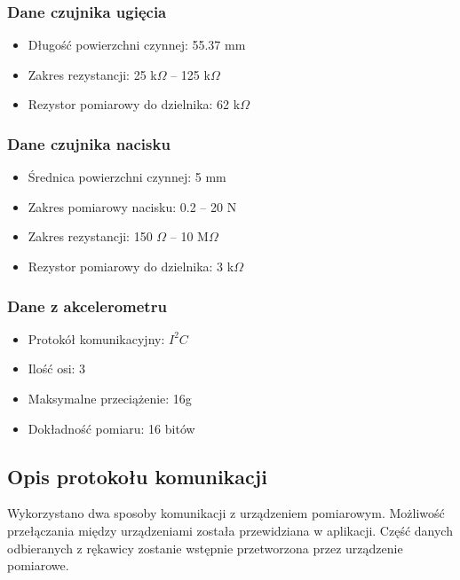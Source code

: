 \documentclass[12pt,a4paper]{article}
\begin{document}
\newpage
\subsubsection{Dane czujnika ugięcia}
\begin{itemize}
\item Długość powierzchni czynnej: 55.37 mm
\item Zakres rezystancji: 25 k$\Omega$ -- 125 k$\Omega$
\item Rezystor pomiarowy do dzielnika: 62 k$\Omega$
\end{itemize}
\subsubsection{Dane czujnika nacisku}
\begin{itemize}
\item Średnica powierzchni czynnej: 5 mm
\item Zakres pomiarowy nacisku: 0.2 -- 20 N
\item Zakres rezystancji: 150 $\Omega$ -- 10 M$\Omega$
\item Rezystor pomiarowy do dzielnika: 3 k$\Omega$
\end{itemize}
\subsubsection{Dane z akcelerometru}
\begin{itemize}
\item Protokół komunikacyjny: $I^2C$
\item Ilość osi: 3
\item Maksymalne przeciążenie: 16g
\item Dokładność pomiaru: 16 bitów 
\end{itemize}

\subsection{Opis protokołu komunikacji}
Wykorzystano dwa sposoby komunikacji z urządzeniem pomiarowym. Możliwość przełączania między urządzeniami została przewidziana w aplikacji. Część danych odbieranych z rękawicy zostanie wstępnie przetworzona przez urządzenie pomiarowe.\\
\end{document}
